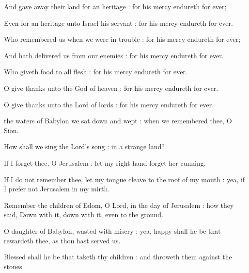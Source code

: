 And gave away their land for an heritage : for his mercy endureth for ever;\par
{}Even for an heritage unto Israel his servant : for his mercy endureth for ever.\par
{}Who remembered us when we were in trouble : for his mercy endureth for ever;\par
{}And hath delivered us from our enemies : for his mercy endureth for ever.\par
{}Who giveth food to all flesh : for his mercy endureth for ever.\par
{}O give thanks unto the God of heaven : for his mercy endureth for ever.\par
{}O give thanks unto the Lord of lords : for his mercy endureth for ever.\par


 the waters of Babylon we sat down and wept : when we remembered thee, O Sion.\par
{}
How shall we sing the Lord's song : in a strange land?\par
{}If I forget thee, O Jerusalem : let my right hand forget her cunning.\par
{}If I do not remember thee, let my tongue cleave to the roof of my mouth : yea, if I prefer not Jerusalem in my mirth.\par
{}Remember the children of Edom, O Lord, in the day of Jerusalem : how they said, Down with it, down with it, even to the ground.\par
{}O daughter of Babylon, wasted with misery : yea, happy shall he be that rewardeth thee, as thou hast served us.\par
{}Blessed shall he be that taketh thy children : and throweth them against the stones.\par


